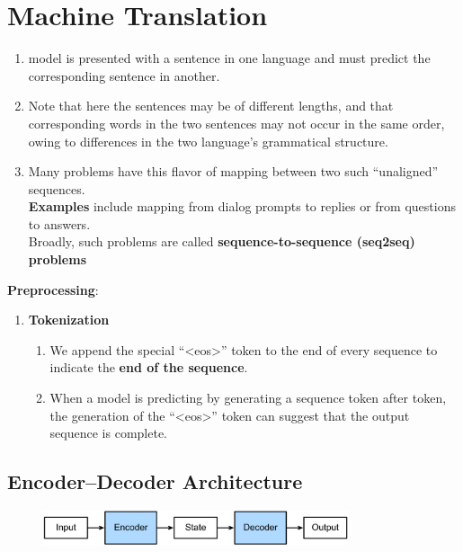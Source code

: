 \chapter{Machine Translation \cite{dnn-1}} \label{chapter: Machine Translation}

\begin{enumerate}
    \item model is presented with a sentence in one language and must predict the corresponding sentence in another. 
    
    \item Note that here the sentences may be of different lengths, and that corresponding words in the two sentences may not occur in the same order, owing to differences in the two language’s grammatical structure.

    \item Many problems have this flavor of mapping between two such “unaligned” sequences.\\
    \textbf{Examples} include mapping from dialog prompts to replies or from questions to answers. \\
    Broadly, such problems are called \textbf{sequence-to-sequence (seq2seq) problems}
\end{enumerate}

\vspace{0.5cm}
\noindent
\textbf{Preprocessing}:
\begin{enumerate}
    \item \textbf{Tokenization}
    \begin{enumerate}
        \item We append the special “<eos>” token to the end of every sequence to indicate the \textbf{end of the sequence}.
        
        \item When a model is predicting by generating a sequence token after token, the generation of the “<eos>” token can suggest that the output sequence is complete. 

    \end{enumerate}

\end{enumerate}


\section{Encoder–Decoder Architecture \cite{dnn-1}} \label{Encoder–Decoder Architecture}

\begin{figure}[H]
    \centering
    \includegraphics[width=\linewidth, height=1cm, keepaspectratio]{Pictures/Recurrent-Neural-Networks/encoder-decoder.jpg}
\end{figure}

